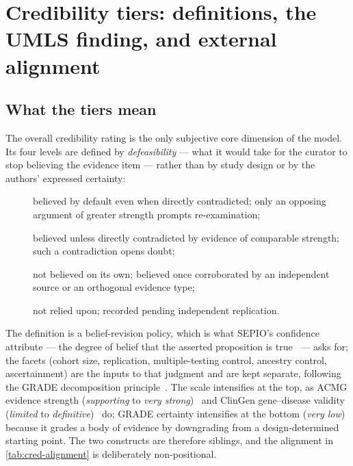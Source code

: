 \section{Credibility tiers: definitions, the UMLS finding, and external alignment}
\label{sec:supp-credibility}

\subsection{What the tiers mean}
\label{sec:supp-credibility-defs}

The overall credibility rating is the only subjective core dimension of the
model. Its four levels are defined by \emph{defeasibility} --- what it would
take for the curator to stop believing the evidence item --- rather than by
study design or by the authors' expressed certainty:

\begin{description}
  \item[] believed by default even when directly
    contradicted; only an opposing argument of greater strength prompts
    re-examination;
  \item[] believed unless directly contradicted by evidence of
    comparable strength; such a contradiction opens doubt;
  \item[] not believed on its own; believed once corroborated
    by an independent source or an orthogonal evidence type;
  \item[] not relied upon; recorded pending independent
    replication.
\end{description}

The definition is a belief-revision policy, which is what SEPIO's confidence
attribute --- the degree of belief that the asserted proposition is
true~\cite{sepio} --- asks for; the facets (cohort size, replication,
multiple-testing control, ancestry control, ascertainment) are the inputs to
that judgment and are kept separate, following the GRADE decomposition
principle~\cite{grade2008}. The scale intensifies at the top, as ACMG
evidence strength (\emph{supporting} to \emph{very strong})~\cite{acmg2015}
and ClinGen gene--disease validity (\emph{limited} to
\emph{definitive})~\cite{clingen2018} do; GRADE certainty intensifies at
the bottom (\emph{very low}) because it grades a body of evidence by
downgrading from a design-determined starting point. The two constructs are
therefore siblings, and the alignment in \cref{tab:cred-alignment} is
deliberately non-positional.

